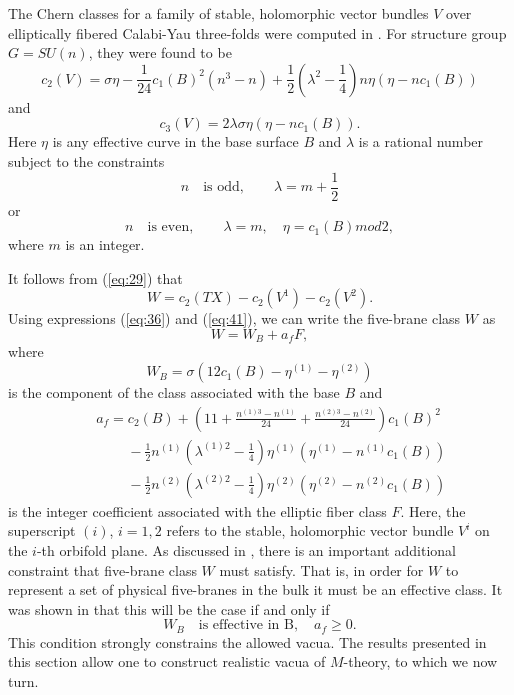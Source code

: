 \documentclass[a4paper,12pt]{article}
\numberwithin{equation}{section}
\theoremstyle{plain}
\begin{document}
The Chern classes for a family of stable, holomorphic vector bundles $V$
over elliptically fibered Calabi-Yau three-folds were computed in
\cite{FMW1,FMW2}. For
structure group $G=SU(n)$, they were found to be
%
\begin{equation}
c_{2}(V)=\sigma \eta - \frac{1}{24}c_{1}(B)^{2}(n^{3}-n) + \frac{1}{2}
\left(\lambda^{2}-\frac{1}{4}\right)n\eta(\eta-nc_{1}(B))
\label{eq:41}
\end{equation}
%
and
%
\begin{equation}
c_{3}(V)=2\lambda \sigma \eta(\eta-nc_{1}(B)).
\label{eq:42}
\end{equation}
%
Here $\eta$ is any effective curve in the base surface $B$ and $\lambda$ is a
rational number subject to the constraints
%
\begin{equation}
n \quad \mbox{is odd}, \qquad \lambda=m+\frac{1}{2}
\label{eq:43}
\end{equation}
%
or
%
\begin{equation}
n \quad \mbox{is even}, \qquad \lambda=m, \quad \eta=c_{1}(B)mod2,
\label{eq:44}
\end{equation}
%
where $m$ is an integer.

It follows from (\ref{eq:29}) that
%
\begin{equation}
W=c_{2}(TX)-c_{2}(V^{1})-c_{2}(V^{2}).
\label{eq:45}
\end{equation}
%
Using expressions (\ref{eq:36}) and (\ref{eq:41}), we can write the
five-brane class $W$ as
%
\begin{equation}
W=W_{B}+a_{f}F,
\label{eq:46}
\end{equation}
%
where
%
\begin{equation}
W_{B}=\sigma(12c_{1}(B)-\eta^{(1)}-\eta^{(2)})
\label{eq:47}
\end{equation}
%
is the component of the class associated with the base $B$ and
%
\begin{eqnarray}
\nonumber
& & a_{f}= c_{2}(B)+\left(11 +\frac{n^{(1)3}-n^{(1)}}{24} +\frac{n^{(2)3}-n^{(2)}}{24}\right)c_{1}(B)^{2} \\
\nonumber
& & \;\;\;\;\;\;\;\;-\frac{1}{2}n^{(1)}\left(\lambda^{(1)2}-\frac{1}{4}\right)\eta^{(1)}(\eta^{(1)}-n^{(1)}c_{1}(B)) \\
& & \;\;\;\;\;\;\;\;-\frac{1}{2}n^{(2)}\left(\lambda^{(2)2}-\frac{1}{4}\right)\eta^{(2)}(\eta^{(2)}-n^{(2)}c_{1}(B))
\label{eq:48}
\end{eqnarray}
%
is the integer coefficient associated with the elliptic fiber class $F$. Here, the
superscript $(i)$, $i=1,2$ refers to the stable, holomorphic vector bundle $V^{i}$
on the $i$-th orbifold plane. As discussed in \cite{RD1}, there is an important
additional constraint that five-brane class $W$ must satisfy. That is, 
in order for $W$ to represent a set of physical five-branes in the bulk 
it must be an effective class. It was shown in \cite{RD1} that this will be 
the case if and only if
%
\begin{equation}
W_{B} \quad \mbox{is effective in B}, \quad a_{f}\geq 0.
\label{eq:49}
\end{equation}
%
This condition strongly constrains the allowed vacua.
The results presented in this section allow one to construct realistic vacua
of $M$-theory, to which we now turn.
\end{document}
